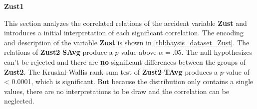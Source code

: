 \Large
\centerline{\textbf{Zust1}}
\normalsize
This section analyzes the correlated relations of the accident variable \textbf{Zust} and introduces a initial interpretation of each significant correlation. The encoding and description of the variable \textbf{Zust} is shown in \cref{tbl:baysis_dataset_Zust}. The relations of \textbf{Zust2}-\textbf{SAvg} produce a $p$-value above $\alpha=.05$. The null hypothesizes can't be rejected and there are \textbf{no} significant differences between the groups of \textbf{Zust2}. The Kruskal-Wallis rank sum test of \textbf{Zust2}-\textbf{TAvg} produces a $p$-value of < 0.0001, which is significant. But because the distribution only contains a single values, there are no interpretations to be draw and the correlation can be neglected.

